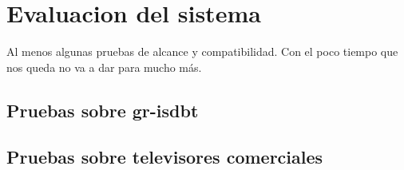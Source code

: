 \chapter{Evaluacion del sistema}

Al menos algunas pruebas de alcance y compatibilidad. Con el poco tiempo que nos queda no va a dar para mucho más. 

\section{Pruebas sobre gr-isdbt}
\section{Pruebas sobre televisores comerciales}